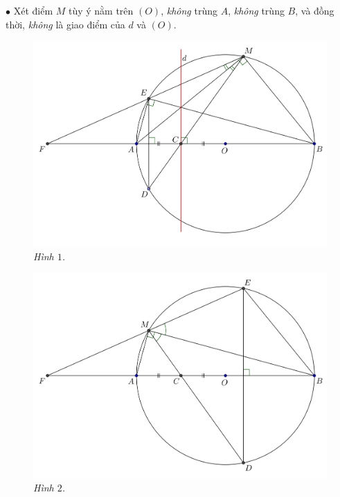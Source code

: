 \begin{multicols}{2}
	\vskip 0.05cm
	$\bullet$ Xét điểm $M$ tùy ý nằm trên $(O)$, \textit{không} trùng $A$, \textit{không} trùng $B$, và đồng thời, \textit{không} là giao điểm của $d$ và $(O)$.
	\begin{figure}[H]
		\vspace*{-5pt}
		\centering
		\captionsetup{labelformat= empty, justification=centering}
		\includegraphics[width= 1\linewidth]{P753-Fig1}
		\caption{\small\textit{\color{thachthuctoanhoc}Hình $1$.}}
		\vspace*{-10pt}
	\end{figure}
	\begin{figure}[H]
		\vspace*{-5pt}
		\centering
		\captionsetup{labelformat= empty, justification=centering}
		\includegraphics[width= 1\linewidth]{P753-Fig2}
		\caption{\small\textit{\color{thachthuctoanhoc}Hình $2$.}}

\end{figure}
\end{multicols}
